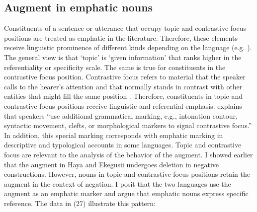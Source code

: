 \documentclass[output=paper]{langscibook}
\begin{document}
\subsection{Augment in emphatic nouns}\label{sec:choti:5.3}
Constituents of a sentence or utterance that occupy topic and contrastive focus positions are treated as emphatic in the literature. Therefore, these elements receive linguistic prominence of different kinds depending on the language (e.g. \citealt{gundel2004topic}). The general view is that ‘topic’ is ‘given information’ that ranks higher in the referentiality or specificity scale. The same is true for constituents in the contrastive focus position. Contrastive focus refers to material that the speaker calls to the hearer’s attention and that normally stands in contrast with other entities that might fill the same position \citep[181]{gundel2004topic}. Therefore, constituents in topic and contrastive focus positions receive linguistic and referential emphasis. \citet{zimmermann2008contrastive} explains that speakers “use additional grammatical marking, e.g., intonation contour, syntactic movement, clefts, or morphological markers to signal contrastive focus.” In addition, this special marking corresponds with emphatic marking in descriptive and typological accounts in some languages. Topic and contrastive focus are relevant to the analysis of the behavior of the augment. I showed earlier that the augment in Haya and Ekegusii undergoes deletion in negative constructions. However, nouns in topic and contrastive focus positions retain the augment in the context of negation. I posit that the two languages use the augment as an emphatic marker and argue that emphatic nouns express specific reference. The data in (27) illustrate this pattern:
\end{document}
